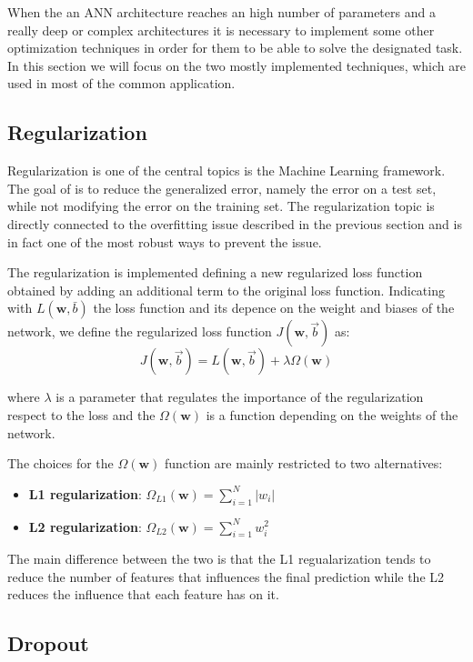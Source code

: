 When the an ANN architecture reaches an high number of parameters and a really deep or complex architectures it is necessary to implement some other optimization techniques in order for them to be able to solve the designated task. In this section we will focus on the two mostly implemented techniques, which are used in most of the common application.

\subsection{Regularization}\label{regularization}

Regularization is one of the central topics is the Machine Learning framework. The goal of is to reduce the generalized error, namely the error on a test set, while not modifying the error on the training set. The regularization topic is directly connected to the overfitting issue described in the previous section and is in fact one of the most robust ways to prevent the issue. 

The regularization is implemented defining a new regularized loss function obtained by adding an additional term to the original loss function. Indicating with $L(\boldsymbol{w},\bar{b})$ the loss function and its depence on the weight and biases of the network, we define the regularized loss function $J(\mathbf{w}, \vec{b})$ as:
\begin{equation}
J(\mathbf{w}, \vec{b})=L(\mathbf{w}, \vec{b})+ \lambda\Omega(\mathbf{w})
\end{equation}

where $\lambda$ is a parameter that regulates the importance of the regularization respect to the loss and the $\Omega(\mathbf{w})$ is a function depending on the weights of the network. 

The choices for the $\Omega(\mathbf{w})$ function are mainly restricted to two alternatives:
\begin{itemize}
    \item \textbf{L1 regularization}: $\Omega_{L1}(\mathbf{w}) = \sum_{i=1}^N |w_i|$
    \item \textbf{L2 regularization}: $\Omega_{L2}(\mathbf{w}) = \sum_{i=1}^N w_i^2$
\end{itemize}

The main difference between the two is that the L1 regualarization tends to reduce the number of features that influences the final prediction while the L2 reduces the influence that each feature has on it.


\subsection{Dropout}\label{dropout}

